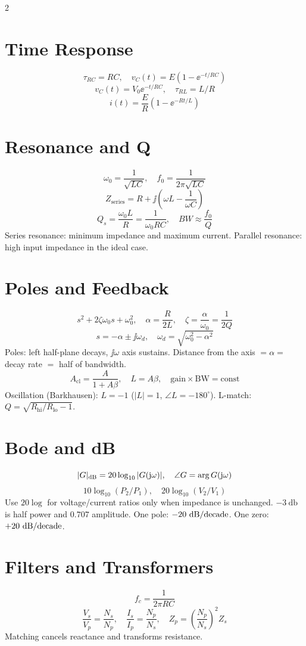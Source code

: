 \documentclass[10pt,letterpaper]{article}
\begin{document}
\begin{multicols}{2}
\section*{Time Response}
\[
\tau_{RC}=RC,\quad v_C(t)=E(1-\ee^{-t/RC})
\]
\[
v_C(t)=V_0\ee^{-t/RC},\quad
\tau_{RL}=L/R
\]
\[
i(t)=\frac{E}{R}(1-\ee^{-Rt/L})
\]

\section*{Resonance and Q}
\[
\omega_0=\frac{1}{\sqrt{LC}},\quad
f_0=\frac{1}{2\pi\sqrt{LC}}
\]
\[
Z_{\mathrm{series}}=R+\jj\left(\omega L-\frac{1}{\omega C}\right)
\]
\[
Q_s=\frac{\omega_0L}{R}=\frac{1}{\omega_0RC},\quad
BW\approx \frac{f_0}{Q}
\]
Series resonance: minimum impedance and maximum current. Parallel resonance:
high input impedance in the ideal case.

\section*{Poles and Feedback}
\[
s^2+2\zeta\omega_0 s+\omega_0^2,\quad
\alpha=\frac{R}{2L},\quad
\zeta=\frac{\alpha}{\omega_0}=\frac{1}{2Q}
\]
\[
s=-\alpha\pm\jj\omega_d,\quad \omega_d=\sqrt{\omega_0^2-\alpha^2}
\]
Poles: left half-plane decays, \(\jj\omega\) axis sustains. Distance from the
axis \(=\alpha=\) decay rate \(=\) half of bandwidth.
\[
A_{\mathrm{cl}}=\frac{A}{1+A\beta},\quad L=A\beta,\quad
\text{gain}\times\text{BW}=\text{const}
\]
Oscillation (Barkhausen): \(L=-1\) (\(|L|=1\), \(\angle L=-180^\circ\)). L-match:
\(Q=\sqrt{R_{\text{hi}}/R_{\text{lo}}-1}\).

\section*{Bode and dB}
\[
|G|_{\mathrm{dB}}=20\log_{10}|G(\mathrm{j}\omega)|,\quad
\angle G=\arg G(\mathrm{j}\omega)
\]
\[
10\log_{10}(P_2/P_1),\quad
20\log_{10}(V_2/V_1)
\]
Use \(20\log\) for voltage/current ratios only when impedance is unchanged.
\(-\SI{3}{\decibel}\) is half power and \(0.707\) amplitude. One pole:
\(-20~\mathrm{dB}/\text{decade}\). One zero: \(+20~\mathrm{dB}/\text{decade}\).

\section*{Filters and Transformers}
\[
f_c=\frac{1}{2\pi RC}
\]
\[
\frac{V_s}{V_p}=\frac{N_s}{N_p},\quad
\frac{I_s}{I_p}=\frac{N_p}{N_s},\quad
Z_p=\left(\frac{N_p}{N_s}\right)^2Z_s
\]
Matching cancels reactance and transforms resistance.


\end{multicols}
\end{document}
